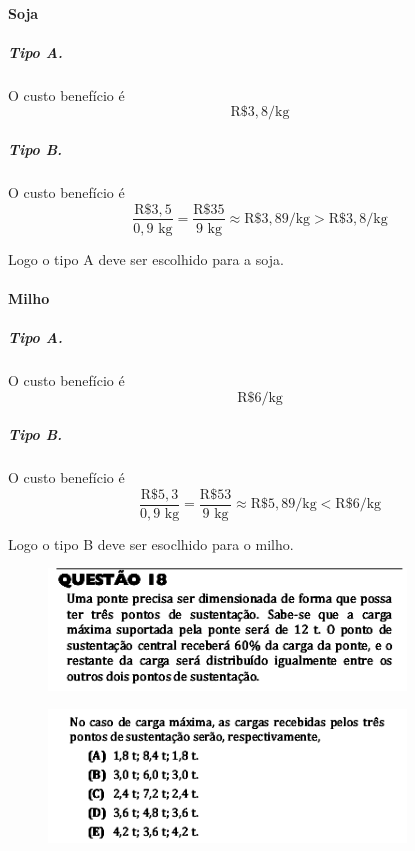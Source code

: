 \documentclass[a4paper]{article}
\begin{document}
\paragraph{Soja}
\subparagraph{Tipo A.} O custo benefício é
\begin{equation*}
\text{R\$}3,8/\text{kg}
\end{equation*}
\subparagraph{Tipo B.} O custo benefício é
\begin{equation*}
\frac{\text{R\$}3,5}{0,9\text{ kg}} = \frac{\text{R\$}35}{9\text{ kg}} \approx \text{R\$}3,89/\text{kg} > \text{R\$}3,8/\text{kg}
\end{equation*}
\par\vspace{0.3cm} Logo o tipo A deve ser escolhido para a soja.
\paragraph{Milho}
\subparagraph{Tipo A.} O custo benefício é
\begin{equation*}
\text{R\$}6/\text{kg}
\end{equation*}
\subparagraph{Tipo B.} O custo benefício é
\begin{equation*}
\frac{\text{R\$}5,3}{0,9\text{ kg}} = \frac{\text{R\$}53}{9\text{ kg}} \approx \text{R\$}5,89/\text{kg} < \text{R\$}6/\text{kg}
\end{equation*}
\par\vspace{0.3cm} Logo o tipo B deve ser esoclhido para o milho.
\begin{figure}[H]
	\begin{center}
		\includegraphics[width=9.5cm]{L3Q18_1.png}
	\end{center}
\end{figure}
\begin{figure}[H]
	\begin{center}
		\includegraphics[width=9.5cm]{L3Q18_2.png}
	\end{center}
\end{figure}
\end{document}
